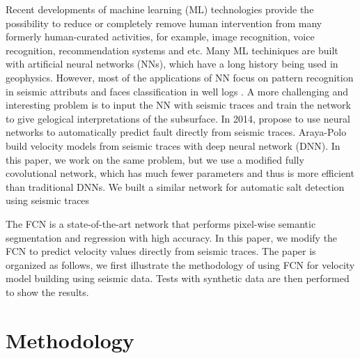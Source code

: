 \documentclass{segabs}
\begin{document}
Recent developments of machine learning (ML) technologies provide the possibility to reduce or completely remove human intervention from many formerly human-curated activities, for example, image recognition, voice recognition, recommendation systems and etc. 
Many ML techiniques are built with artificial neural networks (NNs), which have a long history being used in geophysics. However, most of the applications of NN focus on pattern recognition in seismic attributs  \citep{zeng04,zhao15} and faces classification in well logs \citep{lim05,hall16}. A more challenging and interesting problem is to input the NN with seismic traces and train the network to give gelogical interpretations of the subsurface.
In 2014, \citet{zhang14} propose to use neural networks to automatically predict fault directly from seismic traces. Araya-Polo \citet{araya18} build velocity models from seismic traces with deep neural network (DNN). 
In this paper, we work on the same problem, but we use a modified fully covolutional network, which has much fewer parameters and thus is more efficient than traditional DNNs. We built a similar network for automatic salt detection using seismic traces \citep{wenlong18_salt}

The FCN \citep{long15} is a state-of-the-art network that performs pixel-wise semantic segmentation and regression with high accuracy. In this paper, we modify the FCN to predict velocity values directly from seismic traces. The paper is organized as follows, we first illustrate the methodology of using FCN for velocity model building using seismic data. Tests with synthetic data are then performed to show the results.


\section{Methodology}
\end{document}
